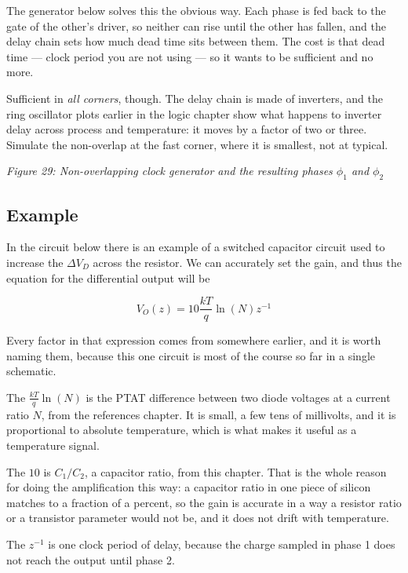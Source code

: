 The generator below solves this the obvious way. Each phase is fed back
to the gate of the other's driver, so neither can rise until the other
has fallen, and the delay chain sets how much dead time sits between
them. The cost is that dead time --- clock period you are not using ---
so it wants to be sufficient and no more.

Sufficient in \emph{all corners}, though. The delay chain is made of
inverters, and the ring oscillator plots earlier in the logic chapter
show what happens to inverter delay across process and temperature: it
moves by a factor of two or three. Simulate the non-overlap at the fast
corner, where it is smallest, not at typical.


{
\centering
{}
}

\emph{Figure 29: Non-overlapping clock generator and the resulting
phases \(\phi_1\) and \(\phi_2\)}

\subsection{Example}\label{example}

In the circuit below there is an example of a switched capacitor circuit
used to increase the \(\Delta V_{D}\) across the resistor. We can
accurately set the gain, and thus the equation for the differential
output will be

\[ V_O(z) = 10 \frac{kT}{q} \ln (N)z^{-1} \]

Every factor in that expression comes from somewhere earlier, and it is
worth naming them, because this one circuit is most of the course so far
in a single schematic.

The \(\frac{kT}{q}\ln(N)\) is the PTAT difference between two diode
voltages at a current ratio \(N\), from the references chapter. It is
small, a few tens of millivolts, and it is proportional to absolute
temperature, which is what makes it useful as a temperature signal.

The \(10\) is \(C_1/C_2\), a capacitor ratio, from this chapter. That is
the whole reason for doing the amplification this way: a capacitor ratio
in one piece of silicon matches to a fraction of a percent, so the gain
is accurate in a way a resistor ratio or a transistor parameter would
not be, and it does not drift with temperature.

The \(z^{-1}\) is one clock period of delay, because the charge sampled
in phase 1 does not reach the output until phase 2.

